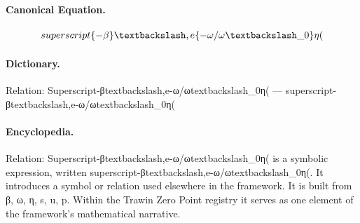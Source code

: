 \paragraph{Canonical Equation.}
\[
superscript{\{-\beta\}\textbackslash,e}\{-\omega/\omega\textbackslash\_0\}\eta(
\]

\paragraph{Dictionary.}
Relation: Superscript-βtextbackslash,e-ω/ωtextbackslash\_0η( — superscript-βtextbackslash,e-ω/ωtextbackslash\_0η(

\paragraph{Encyclopedia.}
Relation: Superscript-βtextbackslash,e-ω/ωtextbackslash\_0η( is a symbolic expression, written superscript-βtextbackslash,e-ω/ωtextbackslash\_0η(. It introduces a symbol or relation used elsewhere in the framework. It is built from β, ω, η, s, u, p. Within the Trawin Zero Point registry it serves as one element of the framework's mathematical narrative.
